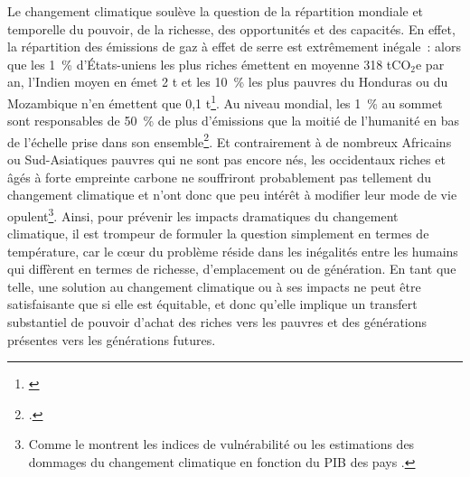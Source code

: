\documentclass[a5paper,french]{memoir}
\begin{document}
Le changement climatique soulève la question de la répartition mondiale et temporelle du pouvoir, de la richesse, des opportunités et des capacités. En effet, la répartition des émissions de gaz à effet de serre est extrêmement inégale~: alors que les 1~\% d'États-uniens les plus riches émettent en moyenne 318 tCO$_\text{2}$e par an, l'Indien moyen en émet 2 t et les 10~\% les plus pauvres du Honduras ou du Mozambique n'en émettent que 0,1 t\footnote{\citet{chancel_carbon_2015}}. Au niveau mondial, les 1~\% au sommet sont responsables de 50~\% de plus d'émissions que la moitié de l'humanité en bas de l'échelle prise dans son ensemble\footnote{\cite{bruckner_impacts_2022}.}. 
Et contrairement à de nombreux Africains ou Sud-Asiatiques pauvres qui ne sont pas encore nés, les occidentaux riches et âgés à forte empreinte carbone ne souffriront probablement pas tellement du changement climatique et n'ont donc que peu intérêt à modifier leur mode de vie opulent\footnote{Comme le montrent les indices de vulnérabilité \citep{chen_university_2015} ou les estimations des dommages du changement climatique en fonction du PIB des pays \citep{burke_global_2015}.}. 
Ainsi, pour prévenir les impacts dramatiques du changement climatique, il est trompeur de formuler la question simplement en termes de température, %
car le cœur du problème réside dans les inégalités entre les humains qui diffèrent en termes de richesse, d'emplacement ou de génération. En tant que telle, une solution au changement climatique ou à ses impacts ne peut être satisfaisante que si elle est équitable, et donc qu'elle implique un transfert substantiel de pouvoir d'achat des riches vers les pauvres et des générations présentes vers les générations futures.%

\end{document}
